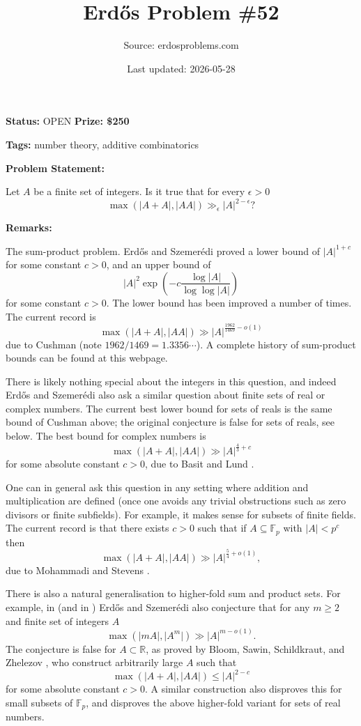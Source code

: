 \documentclass{article}
\title{Erd\H{o}s Problem \#52}
\date{Last updated: 2026-05-28}
\author{Source: erdosproblems.com}
\begin{document}
\maketitle

\noindent\textbf{Status:} OPEN \quad \textbf{Prize: \$250}

\noindent\textbf{Tags:} number theory, additive combinatorics

\medskip
\noindent\textbf{Problem Statement:}

Let $A$ be a finite set of integers. Is it true that for every $\epsilon>0$\[\max( \lvert A+A\rvert,\lvert AA\rvert)\gg_\epsilon \lvert A\rvert^{2-\epsilon}?\]

\bigskip
\noindent\textbf{Remarks:}

The sum-product problem. Erd\H{o}s and Szemer\'{e}di \cite{ErSz83} proved a lower bound of $\lvert A\rvert^{1+c}$ for some constant $c>0$, and an upper bound of\[\lvert A\rvert^2 \exp\left(-c\frac{\log\lvert A\rvert}{\log\log \lvert A\rvert}\right)\]for some constant $c>0$. The lower bound has been improved a number of times. The current record is\[\max( \lvert A+A\rvert,\lvert AA\rvert)\gg\lvert A\rvert^{\frac{1962}{1469}-o(1)}\]due to Cushman \cite{Cu25} (note $1962/1469=1.3356\cdots$). A complete history of sum-product bounds can be found at this webpage.

There is likely nothing special about the integers in this question, and indeed Erd\H{o}s and Szemer\'{e}di also ask a similar question about finite sets of real or complex numbers. The current best lower bound for sets of reals is the same bound of Cushman above; the original conjecture is false for sets of reals, see below. The best bound for complex numbers is\[\max( \lvert A+A\rvert,\lvert AA\rvert)\gg\lvert A\rvert^{\frac{4}{3}+c}\]for some absolute constant $c>0$, due to Basit and Lund \cite{BaLu19}. 

One can in general ask this question in any setting where addition and multiplication are defined (once one avoids any trivial obstructions such as zero divisors or finite subfields). For example, it makes sense for subsets of finite fields. The current record is that there exists $c>0$ such that if $A\subseteq \mathbb{F}_p$ with $\lvert A\rvert <p^{c}$ then\[\max( \lvert A+A\rvert,\lvert AA\rvert)\gg\lvert A\rvert^{\frac{5}{4}+o(1)},\]due to Mohammadi and Stevens \cite{MoSt23}.

There is also a natural generalisation to higher-fold sum and product sets. For example, in \cite{ErSz83} (and in \cite{Er91}) Erd\H{o}s and Szemer\'{e}di also conjecture that for any $m\geq 2$ and finite set of integers $A$\[\max( \lvert mA\rvert,\lvert A^m\rvert)\gg \lvert A\rvert^{m-o(1)}.\]The conjecture is false for $A\subset \mathbb{R}$, as proved by Bloom, Sawin, Schildkraut, and Zhelezov \cite{BSSZ26}, who construct arbitrarily large $A$ such that\[\max(\lvert A+A\rvert, \lvert AA\rvert) \leq \lvert A\rvert^{2-c}\]for some absolute constant $c>0$. A similar construction also disproves this for small subsets of $\mathbb{F}_p$, and disproves the above higher-fold variant for sets of real numbers.
\end{document}
